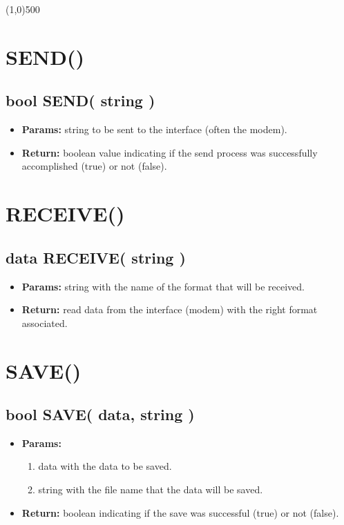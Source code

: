 \documentclass[11pt,a4paper]{article}
\begin{document}
\begin{center}
\line(1,0){500}
\end{center}

\section*{SEND()}
\begin{framed}
\subsection*{bool SEND( string )}
\begin{itemize}
\item \textbf{Params:} string to be sent to the interface (often the modem).
\item \textbf{Return:} boolean value indicating if the send process was successfully accomplished (true) or not (false).
\end{itemize}
\end{framed}

\section*{RECEIVE()}
\begin{framed}
\subsection*{data RECEIVE( string )}
\begin{itemize}
\item \textbf{Params:} string with the name of the format that will be received.
\item \textbf{Return:} read data from the interface  (modem) with the right format associated.
\end{itemize}
\end{framed}

\section*{SAVE()}
\begin{framed}
\subsection*{bool SAVE( data, string )}
\begin{itemize}
\item \textbf{Params:}
\begin{enumerate}
\item data with the data to be saved.
\item string with the file name that the data will be saved.
\end{enumerate}
\item \textbf{Return:} boolean indicating if the save was successful (true) or not (false).
\end{itemize}
\end{framed}
\end{document}
